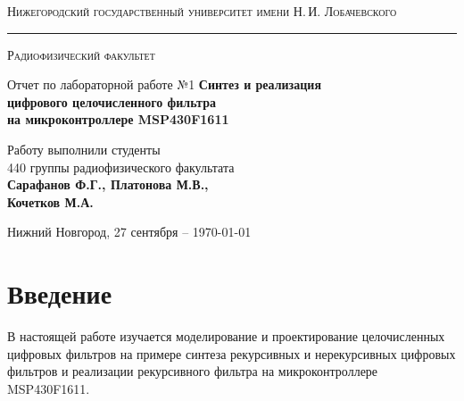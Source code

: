 \documentclass[a4paper,14pt]{extarticle}
\def\labauthors{Сарафанов Ф.Г., Платонова М.В., \\ Кочетков М.А.}
\def\labnumber{1}
\begin{document}
\begin{titlepage}
\begin{center}
{\small\textsc{Нижегородский государственный университет имени Н.\,И. Лобачевского}}
\vskip 2pt \hrule \vskip 3pt
{\small\textsc{Радиофизический факультет}}

\vfill


{{\large Отчет по лабораторной работе №\labnumber}\vskip 12pt {\LARGE \bfseries Синтез и реализация\\[-0.2em] цифрового целочисленного фильтра\\[0.2em]  на  микроконтроллере MSP430F1611}}

	
\vspace{2cm}
{\large Работу выполнили студенты \\[-0.25em] 440 группы радиофизического факультата \\[0.5em] {\Large \bfseries \labauthors}}



\end{center}

\vfill
	
	
	
\begin{center}
	{Нижний Новгород, 27 сентября -- \today}
\end{center}

\end{titlepage}
\tableofcontents
\newpage



\section*{Введение}

В настоящей работе изучается моделирование и проектирование целочисленных цифровых фильтров на примере синтеза рекурсивных и нерекурсивных цифровых фильтров и реализации рекурсивного фильтра на микроконтроллере {MSP430F1611}. 
\end{document}
